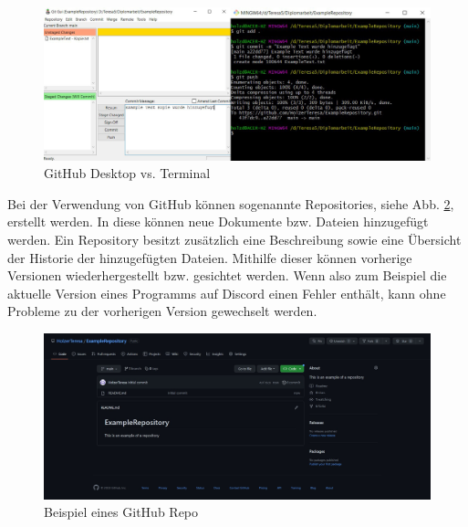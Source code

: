 \begin{figure}[h t]
  \centering
  \includegraphics[scale=0.45]{pics/githubTerminalGUI.png}
  \caption{GitHub Desktop vs. Terminal}
  \label{fig:impl:gitHubTerminalVSGUI}
\end{figure}

Bei der Verwendung von GitHub können sogenannte Repositories, siehe Abb. \ref{fig:impl:githubRepository}, erstellt werden. In diese können neue Dokumente bzw. Dateien hinzugefügt werden. Ein Repository besitzt zusätzlich eine Beschreibung sowie eine Übersicht der Historie der hinzugefügten Dateien. Mithilfe dieser können vorherige Versionen wiederhergestellt bzw. gesichtet werden. Wenn also zum Beispiel die aktuelle Version eines Programms auf Discord einen Fehler enthält, kann ohne Probleme zu der vorherigen Version gewechselt werden. 



\begin{figure}[h t]
  \centering
  \includegraphics[scale=0.38]{pics/exampleRepository.jpg}
  \caption{Beispiel eines GitHub Repo}
  \label{fig:impl:githubRepository}
\end{figure}
